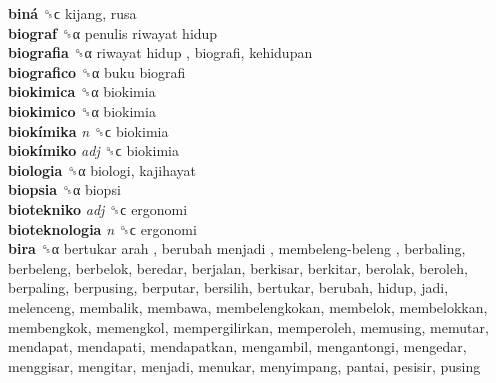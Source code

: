 \textbf{biná} ␝ϲ  kijang, rusa  \\
\textbf{biograf} ␝α   penulis riwayat hidup   \\
\textbf{biografia} ␝α   riwayat hidup , biografi, kehidupan  \\
\textbf{biografico} ␝α   buku biografi   \\
\textbf{biokimica} ␝α  biokimia  \\
\textbf{biokimico} ␝α  biokimia  \\
\textbf{biokímika} \emph{n}  ␝ϲ  biokimia  \\
\textbf{biokímiko} \emph{adj}  ␝ϲ  biokimia  \\
\textbf{biologia} ␝α  biologi, kajihayat  \\
\textbf{biopsia} ␝α  biopsi  \\
\textbf{biotekniko} \emph{adj}  ␝ϲ  ergonomi  \\
\textbf{bioteknologia} \emph{n}  ␝ϲ  ergonomi  \\
\textbf{bira} ␝α   bertukar arah ,  berubah menjadi ,  membeleng-beleng , berbaling, berbeleng, berbelok, beredar, berjalan, berkisar, berkitar, berolak, beroleh, berpaling, berpusing, berputar, bersilih, bertukar, berubah, hidup, jadi, melenceng, membalik, membawa, membelengkokan, membelok, membelokkan, membengkok, memengkol, mempergilirkan, memperoleh, memusing, memutar, mendapat, mendapati, mendapatkan, mengambil, mengantongi, mengedar, menggisar, mengitar, menjadi, menukar, menyimpang, pantai, pesisir, pusing  \\
